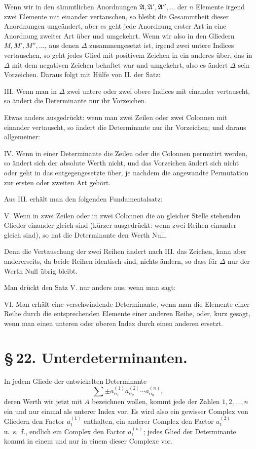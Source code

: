 \documentclass[11pt]{article}
\begin{document}
Wenn wir in den sämmtlichen Anordnungen \(\mathfrak A,\mathfrak A',\mathfrak A'',\ldots\) der \(n\) Elemente irgend zwei Elemente mit einander vertauschen, so bleibt die Gesammtheit dieser Anordnungen ungeändert, aber es geht jede Anordnung erster Art in eine Anordnung zweiter Art über und umgekehrt. Wenn wir also in den Gliedern \(M,M',M'',\ldots\), aus denen \(\Delta\) zusammengesetzt ist, irgend zwei untere Indices vertauschen, so geht jedes Glied mit positivem Zeichen in ein anderes über, das in \(\Delta\) mit dem negativen Zeichen behaftet war und umgekehrt, also es ändert \(\Delta\) sein Vorzeichen. Daraus folgt mit Hülfe von II. der Satz:

III. Wenn man in \(\Delta\) zwei untere oder zwei obere Indices mit einander vertauscht, so ändert die Determinante nur ihr Vorzeichen.

Etwas anders ausgedrückt: wenn man zwei Zeilen oder zwei Colonnen mit einander vertauscht, so ändert die Determinante nur ihr Vorzeichen; und daraus allgemeiner:

IV. Wenn in einer Determinante die Zeilen oder die Colonnen permutirt werden, so ändert sich der absolute Werth nicht, und das Vorzeichen ändert sich nicht oder geht in das entgegengesetzte über, je nachdem die angewandte Permutation zur ersten oder zweiten Art gehört.

Aus III. erhält man den folgenden Fundamentalsatz:

V. Wenn in zwei Zeilen oder in zwei Colonnen die an gleicher Stelle stehenden Glieder einander gleich sind (kürzer ausgedrückt: wenn zwei Reihen einander gleich sind), so hat die Determinante den Werth Null.

Denn die Vertauschung der zwei Reihen ändert nach III. das Zeichen, kann aber andererseits, da beide Reihen identisch sind, nichts ändern, so dass für \(\Delta\) nur der Werth Null übrig bleibt.

Man drückt den Satz V. nur anders aus, wenn man sagt:

VI. Man erhält eine verschwindende Determinante, wenn man die Elemente einer Reihe durch die entsprechenden Elemente einer anderen Reihe, oder, kurz gesagt, wenn man einen unteren oder oberen Index durch einen anderen ersetzt.

\section*{\S\,22. Unterdeterminanten.}

In jedem Gliede der entwickelten Determinante
\[
\sum \pm a_{\alpha_1}^{(1)}a_{\alpha_2}^{(2)}\cdots a_{\alpha_n}^{(n)},
\]
deren Werth wir jetzt mit \(A\) bezeichnen wollen, kommt jede der Zahlen \(1,2,\ldots,n\) ein und nur einmal als unterer Index vor. Es wird also ein gewisser Complex von Gliedern den Factor \(a_1^{(1)}\) enthalten, ein anderer Complex den Factor \(a_1^{(2)}\) u.~s.~f., endlich ein Complex den Factor \(a_1^{(n)}\); jedes Glied der Determinante kommt in einem und nur in einem dieser Complexe vor.
\end{document}
